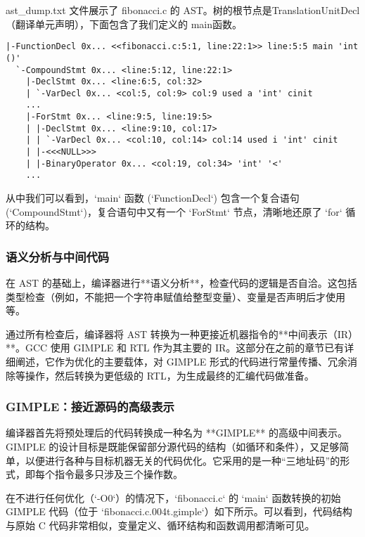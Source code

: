 \documentclass[a4paper]{article}
\begin{document}
ast\_dump.txt 文件展示了 fibonacci.c 的 AST。树的根节点是TranslationUnitDecl（翻译单元声明），下面包含了我们定义的 main函数。
\begin{lstlisting}[language=text, caption={main 函数的抽象语法树片段 (ast\_dump.txt)}]
|-FunctionDecl 0x... <<fibonacci.c:5:1, line:22:1>> line:5:5 main 'int ()'
  `-CompoundStmt 0x... <line:5:12, line:22:1>
    |-DeclStmt 0x... <line:6:5, col:32>
    | `-VarDecl 0x... <col:5, col:9> col:9 used a 'int' cinit
    ...
    |-ForStmt 0x... <line:9:5, line:19:5>
    | |-DeclStmt 0x... <line:9:10, col:17>
    | | `-VarDecl 0x... <col:10, col:14> col:14 used i 'int' cinit
    | |-<<<NULL>>>
    | |-BinaryOperator 0x... <col:19, col:34> 'int' '<'
    ...
\end{lstlisting}
从中我们可以看到，`main` 函数 (`FunctionDecl`) 包含一个复合语句 (`CompoundStmt`)，复合语句中又有一个 `ForStmt` 节点，清晰地还原了 `for` 循环的结构。

\subsubsection{语义分析与中间代码}
在 AST 的基础上，编译器进行**语义分析**，检查代码的逻辑是否自洽。这包括类型检查（例如，不能把一个字符串赋值给整型变量）、变量是否声明后才使用等。

通过所有检查后，编译器将 AST 转换为一种更接近机器指令的**中间表示（IR）**。GCC 使用 GIMPLE 和 RTL 作为其主要的 IR。这部分在之前的章节已有详细阐述，它作为优化的主要载体，对 GIMPLE 形式的代码进行常量传播、冗余消除等操作，然后转换为更低级的 RTL，为生成最终的汇编代码做准备。

\subsubsection{GIMPLE：接近源码的高级表示}

编译器首先将预处理后的代码转换成一种名为 **GIMPLE** 的高级中间表示。GIMPLE 的设计目标是既能保留部分源代码的结构（如循环和条件），又足够简单，以便进行各种与目标机器无关的代码优化。它采用的是一种“三地址码”的形式，即每个指令最多只涉及三个操作数。

在不进行任何优化（`-O0`）的情况下，`fibonacci.c` 的 `main` 函数转换的初始 GIMPLE 代码（位于 `fibonacci.c.004t.gimple`）如下所示。可以看到，代码结构与原始 C 代码非常相似，变量定义、循环结构和函数调用都清晰可见。
\end{document}
